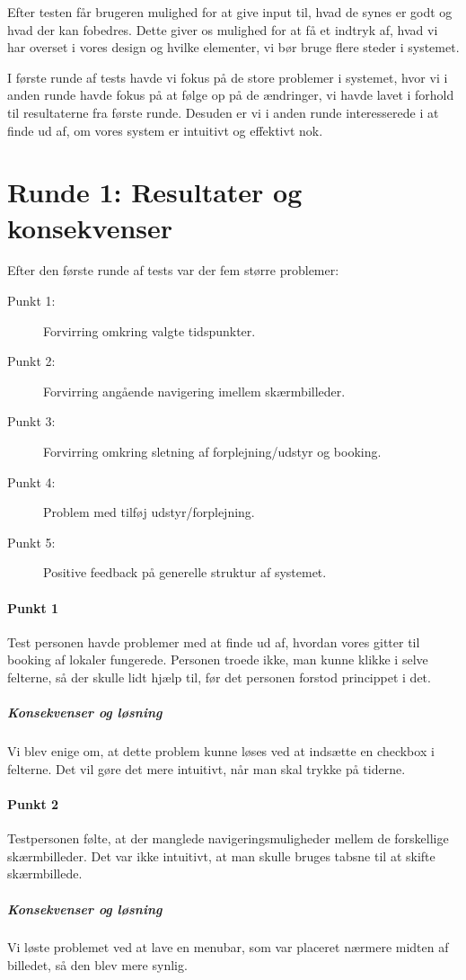 Efter testen får brugeren mulighed for at give input til, hvad de synes er godt og hvad der kan fobedres. Dette giver os mulighed for at få et indtryk af, hvad vi har overset i vores design og hvilke elementer, vi bør bruge flere steder i systemet.

I første runde af tests havde vi fokus på de store problemer i systemet, hvor vi i anden runde havde fokus på at følge op på de ændringer, vi havde lavet i forhold til resultaterne fra første runde. Desuden er vi i anden runde interesserede i at finde ud af, om vores system er intuitivt og effektivt nok.

\section{Runde 1: Resultater og konsekvenser}
\label{Usability_R1}
Efter den første runde af tests var der fem større problemer:
\begin{description}
\item [Punkt 1:] Forvirring omkring valgte tidspunkter.
\item [Punkt 2:] Forvirring angående navigering imellem skærmbilleder.
\item [Punkt 3:] Forvirring omkring sletning af forplejning/udstyr og booking.
\item [Punkt 4:] Problem med tilføj udstyr/forplejning.
\item [Punkt 5:] Positive feedback på generelle struktur af systemet.
\end{description}

\paragraph{Punkt 1}
Test personen havde problemer med at finde ud af, hvordan vores gitter til booking af lokaler fungerede. Personen troede ikke, man kunne klikke i selve felterne, så der skulle lidt hjælp til, før det personen forstod princippet i det.
\subparagraph{Konsekvenser og løsning}
Vi blev enige om, at dette problem kunne løses ved at indsætte en checkbox i felterne. Det vil gøre det mere intuitivt, når man skal trykke på tiderne.

\paragraph{Punkt 2}
Testpersonen følte, at der manglede navigeringsmuligheder mellem de forskellige skærmbilleder. Det var ikke intuitivt, at man skulle bruges tabsne til at skifte skærmbillede.
\subparagraph{Konsekvenser og løsning}
Vi løste problemet ved at lave en menubar, som var placeret nærmere midten af billedet, så den blev mere synlig.

